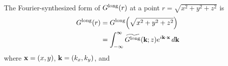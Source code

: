 \documentclass[letterpaper]{article}
\newcommand{\wt}{\widetilde}
\begin{document}
The Fourier-synthesized form of $G^{\hbox{\scriptsize{long}}}(r)$ at
a point $r=\sqrt{x^2+y^2+z^2}$ is
\begin{align*}
 G\sups{long}(r)
   &=G\sups{long}\Big( \sqrt{x^2 + y^2 + z^2} \Big)
\\
   &=\int_{-\infty}^\infty \wt{G\sups{long}}(\vb k; z) e^{i\vb k \cdot \vb x} \, d\vb k
\end{align*}
where $\mathbf{x}=(x,y)$, $\mathbf{k}=(k_x, k_y)$, and 
%

\end{document}
